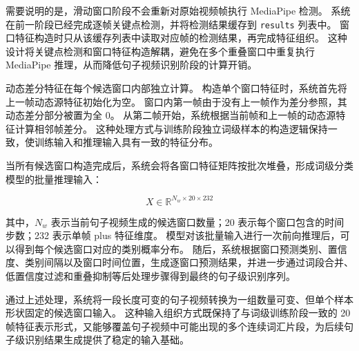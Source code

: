 需要说明的是，滑动窗口阶段不会重新对原始视频帧执行 MediaPipe 检测。
系统在前一阶段已经完成逐帧关键点检测，并将检测结果缓存到 \texttt{results} 列表中。
窗口特征构造时只从该缓存列表中读取对应帧的检测结果，再完成特征组织。
这种设计将关键点检测和窗口特征构造解耦，避免在多个重叠窗口中重复执行 MediaPipe 推理，从而降低句子视频识别阶段的计算开销。

动态差分特征在每个候选窗口内部独立计算。
构造单个窗口特征时，系统首先将上一帧动态源特征初始化为空。
窗口内第一帧由于没有上一帧作为差分参照，其动态差分部分被置为全 0。
从第二帧开始，系统根据当前帧和上一帧的动态源特征计算相邻帧差分。
这种处理方式与训练阶段独立词级样本的构造逻辑保持一致，使训练输入和推理输入具有一致的特征分布。

当所有候选窗口构造完成后，系统会将各窗口特征矩阵按批次堆叠，形成词级分类模型的批量推理输入：

\begin{equation}
X \in \mathbb{R}^{N_w \times 20 \times 232}
\label{eq:chapter06-batch-infer-shape}
\end{equation}

其中，$N_w$ 表示当前句子视频生成的候选窗口数量；20 表示每个窗口包含的时间步数；232 表示单帧 plus 特征维度。
模型对该批量输入进行一次前向推理后，可以得到每个候选窗口对应的类别概率分布。
随后，系统根据窗口预测类别、置信度、类别间隔以及窗口时间位置，生成逐窗口预测结果，并进一步通过词段合并、低置信度过滤和重叠抑制等后处理步骤得到最终的句子级识别序列。

通过上述处理，系统将一段长度可变的句子视频转换为一组数量可变、但单个样本形状固定的候选窗口输入。
这种输入组织方式既保持了与词级训练阶段一致的 20 帧特征表示形式，又能够覆盖句子视频中可能出现的多个连续词汇片段，为后续句子级识别结果生成提供了稳定的输入基础。
